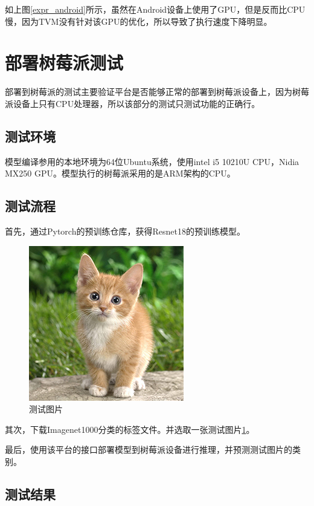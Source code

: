 如上图\ref{expr_android}所示，虽然在Android设备上使用了GPU，但是反而比CPU慢，因为TVM没有针对该GPU的优化，所以导致了执行速度下降明显。


\section{部署树莓派测试}

部署到树莓派的测试主要验证平台是否能够正常的部署到树莓派设备上，因为树莓派设备上只有CPU处理器，所以该部分的测试只测试功能的正确行。

\subsection{测试环境}

模型编译参用的本地环境为64位Ubuntu系统，使用intel i5 10210U CPU，Nidia MX250 GPU。模型执行的树莓派采用的是ARM架构的CPU。


\subsection{测试流程}

首先，通过Pytorch的预训练仓库，获得Resnet18的预训练模型。

\begin{figure}[h!]
    \centering
    \includegraphics[width=180bp]{figure/cat.png}
    \caption{测试图片}
    \label{cat}
\end{figure}

其次，下载Imagenet1000分类的标签文件。并选取一张测试图片\ref{cat}。

最后，使用该平台的接口部署模型到树莓派设备进行推理，并预测测试图片的类别。


\subsection{测试结果}

